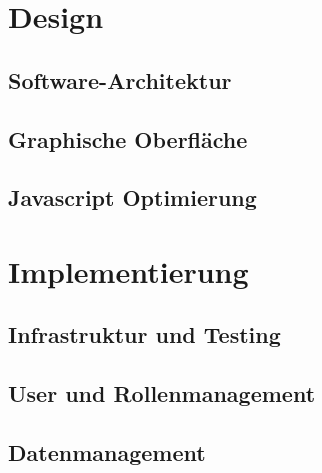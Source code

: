 \documentclass[12pt]{article}
\begin{document}
\section{Design}
\label{sec:design}

\subsection{Software-Architektur}
\label{subsec:softwarearchitektur}


\newpage

\subsection{Graphische Oberfläche}
\label{subsec:graphischeoberflaeche}


\newpage

\subsection{Javascript Optimierung}
\label{subsec:javascriptoptimierung}


\newpage %

\section{Implementierung}
\label{sec:implementierung}

\subsection{Infrastruktur und Testing}
\label{subsec:infrastrukturtesting}


\newpage

\subsection{User und Rollenmanagement}
\label{subsec:usermanagement}


\newpage

\subsection{Datenmanagement}
\label{subsec:datenmanagement}

\end{document}
